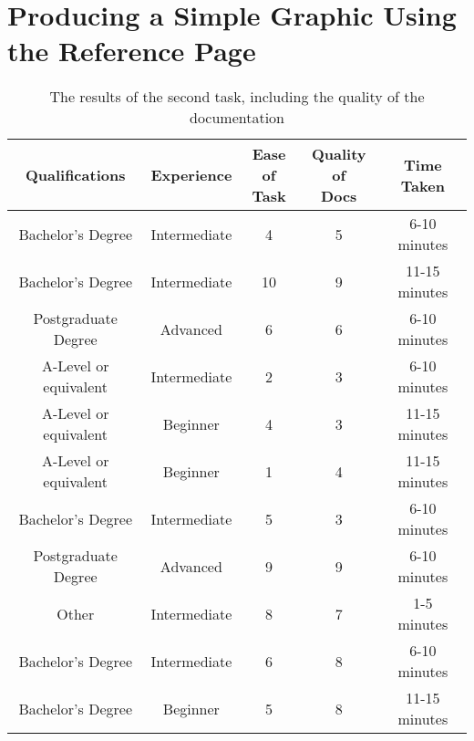 \documentclass[../main.tex]{subfiles}
\begin{document}
        \section*{Producing a Simple Graphic Using the Reference Page}
            \begin{table}[H]
                \centering
                \begin{tabular}{c|c|c|c|c}
                    \textbf{Qualifications} & \textbf{Experience}
                                            & \makecell{\textbf{Ease of}                             \\ \textbf{Task}}
                                            & \makecell{\textbf{Quality of}                          \\ \textbf{Docs}}
                                            & \textbf{Time Taken}                                    \\
                    \hline
                    Bachelor's Degree       & Intermediate                  & 4  & 5 & 6-10 minutes  \\
                    Bachelor's Degree       & Intermediate                  & 10 & 9 & 11-15 minutes \\
                    Postgraduate Degree     & Advanced                      & 6  & 6 & 6-10 minutes  \\
                    A-Level or equivalent   & Intermediate                  & 2  & 3 & 6-10 minutes  \\
                    A-Level or equivalent   & Beginner                      & 4  & 3 & 11-15 minutes \\
                    A-Level or equivalent   & Beginner                      & 1  & 4 & 11-15 minutes \\
                    Bachelor's Degree       & Intermediate                  & 5  & 3 & 6-10 minutes  \\
                    Postgraduate Degree     & Advanced                      & 9  & 9 & 6-10 minutes  \\
                    Other                   & Intermediate                  & 8  & 7 & 1-5 minutes   \\
                    Bachelor's Degree       & Intermediate                  & 6  & 8 & 6-10 minutes  \\
                    Bachelor's Degree       & Beginner                      & 5  & 8 & 11-15 minutes \\
                \end{tabular}
                \caption{The results of the second task, including the quality of the documentation}
            \end{table}
\end{document}
